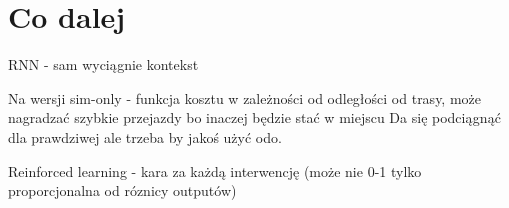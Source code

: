 \chapter{Co dalej}
RNN - sam wyciągnie kontekst

Na wersji sim-only - funkcja kosztu w zależności od odległości od trasy, może nagradzać szybkie przejazdy bo inaczej będzie stać w miejscu
Da się podciągnąć dla prawdziwej ale trzeba by jakoś użyć odo.

Reinforced learning - kara za każdą interwencję (może nie 0-1 tylko proporcjonalna od
róznicy outputów)

